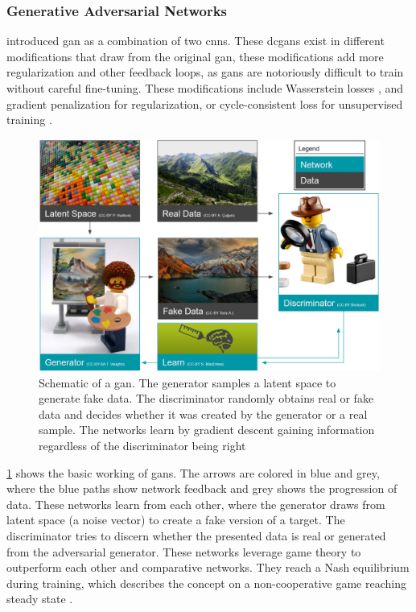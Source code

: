 \subsubsection{Generative Adversarial Networks}
\citet{Goodfellow2014-ax} introduced \acf{gan} as a combination of two \acp{cnn}. These \acfp{dcgan} exist in different modifications that draw from the original \ac{gan}, these modifications add more regularization and other feedback loops, as \acp{gan} are notoriously difficult to train without careful fine-tuning. These modifications include Wasserstein losses \citep{arjovsky2017wasserstein}, and gradient penalization \citep{gulrajani2017improved} for regularization, or cycle-consistent loss for unsupervised training \citep{zhu2017unpaired}.

\begin{figure}
    \centering
    \includegraphics[width=\textwidth]{figures/GAN.PNG}
    \caption{Schematic of a \acl{gan}. The generator samples a latent space to generate fake data. The discriminator randomly obtains real or fake data and decides whether it was created by the generator or a real sample. The networks learn by gradient descent gaining information regardless of the discriminator being right}
    \label{fig:gan}
\end{figure}

\cref{fig:gan} shows the basic working of \acp{gan}. The arrows are colored in blue and grey, where the blue paths show network feedback and grey shows the progression of data. These networks learn from each other, where the generator draws from latent space (a noise vector) to create a fake version of a target. The discriminator tries to discern whether the presented data is real or generated from the adversarial generator. These networks leverage game theory to outperform each other and comparative networks. They reach a Nash equilibrium during training, which describes the concept on a non-cooperative game reaching steady state \citep{nash1951non}. 

